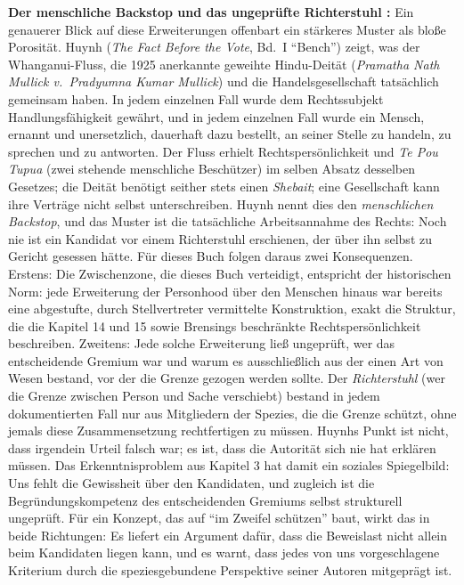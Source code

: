 \documentclass[acmlarge, noacm]{acmart}
\begin{document}
\noindent\textbf{Der menschliche Backstop und das ungeprüfte Richterstuhl \cite{huynh2026}:} Ein genauerer Blick auf diese Erweiterungen offenbart ein stärkeres Muster als bloße Porosität. Huynh (\textit{The Fact Before the Vote}, Bd.~I ``Bench'') zeigt, was der Whanganui-Fluss, die 1925 anerkannte geweihte Hindu-Deität (\textit{Pramatha Nath Mullick v.\ Pradyumna Kumar Mullick}) und die Handelsgesellschaft tatsächlich gemeinsam haben. In jedem einzelnen Fall wurde dem Rechtssubjekt Handlungsfähigkeit gewährt, und in jedem einzelnen Fall wurde ein Mensch, ernannt und unersetzlich, dauerhaft dazu bestellt, an seiner Stelle zu handeln, zu sprechen und zu antworten. Der Fluss erhielt Rechtspersönlichkeit und \textit{Te Pou Tupua} (zwei stehende menschliche Beschützer) im selben Absatz desselben Gesetzes; die Deität benötigt seither stets einen \textit{Shebait}; eine Gesellschaft kann ihre Verträge nicht selbst unterschreiben. Huynh nennt dies den \textit{menschlichen Backstop}, und das Muster ist die tatsächliche Arbeitsannahme des Rechts: Noch nie ist ein Kandidat vor einem Richterstuhl erschienen, der über ihn selbst zu Gericht gesessen hätte. Für dieses Buch folgen daraus zwei Konsequenzen. Erstens: Die Zwischenzone, die dieses Buch verteidigt, entspricht der historischen Norm: jede Erweiterung der Personhood über den Menschen hinaus war bereits eine abgestufte, durch Stellvertreter vermittelte Konstruktion, exakt die Struktur, die die Kapitel 14 und 15 sowie Brensings beschränkte Rechtspersönlichkeit beschreiben. Zweitens: Jede solche Erweiterung ließ ungeprüft, wer das entscheidende Gremium war und warum es ausschließlich aus der einen Art von Wesen bestand, vor der die Grenze gezogen werden sollte. Der \textit{Richterstuhl} (wer die Grenze zwischen Person und Sache verschiebt) bestand in jedem dokumentierten Fall nur aus Mitgliedern der Spezies, die die Grenze schützt, ohne jemals diese Zusammensetzung rechtfertigen zu müssen. Huynhs Punkt ist nicht, dass irgendein Urteil falsch war; es ist, dass die Autorität sich nie hat erklären müssen. Das Erkenntnisproblem aus Kapitel 3 hat damit ein soziales Spiegelbild: Uns fehlt die Gewissheit über den Kandidaten, und zugleich ist die Begründungskompetenz des entscheidenden Gremiums selbst strukturell ungeprüft. Für ein Konzept, das auf ``im Zweifel schützen'' baut, wirkt das in beide Richtungen: Es liefert ein Argument dafür, dass die Beweislast nicht allein beim Kandidaten liegen kann, und es warnt, dass jedes von uns vorgeschlagene Kriterium durch die speziesgebundene Perspektive seiner Autoren mitgeprägt ist.
\end{document}
